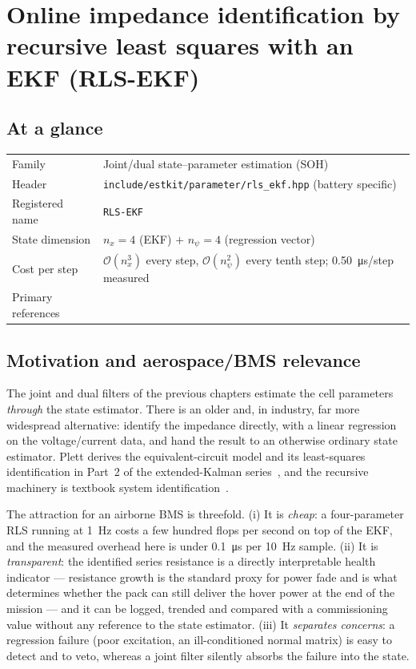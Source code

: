 \chapter{Online impedance identification by recursive least squares with an EKF (RLS-EKF)}
\label{ch:rlsekf}

\section*{At a glance}
\begin{tabular}{@{}l>{\raggedright\arraybackslash}p{}@{}}
Family & Joint/dual state--parameter estimation (SOH) \\
Header & \texttt{include/estkit/parameter/rls\_ekf.hpp} (battery specific) \\
Registered name & \texttt{RLS-EKF} \\
State dimension & $n_x=4$ (EKF) $+$ $n_\psi=4$ (regression vector) \\
Cost per step & $\mathcal{O}(n_x^3)$ every step, $\mathcal{O}(n_\psi^2)$ every tenth step; \SI{0.50}{\micro\second}/step measured \\
Primary references & \cite{plett2004ekf2,plett2004ekf3,ljung1999,plett2016bms2} \\
\end{tabular}

\section{Motivation and aerospace/BMS relevance}
The joint and dual filters of the previous chapters estimate the cell parameters \emph{through} the
state estimator.  There is an older and, in industry, far more widespread alternative: identify the
impedance directly, with a linear regression on the voltage/current data, and hand the result to an
otherwise ordinary state estimator.  Plett derives the equivalent-circuit model and its
least-squares identification in Part~2 of the extended-Kalman series~\cite{plett2004ekf2}, and the
recursive machinery is textbook system identification~\cite[Ch.~11]{ljung1999}.

The attraction for an airborne BMS is threefold.  (i) It is \emph{cheap}: a four-parameter RLS
running at \SI{1}{\hertz} costs a few hundred flops per second on top of the EKF, and the measured
overhead here is under \SI{0.1}{\micro\second} per \SI{10}{\hertz} sample.  (ii) It is
\emph{transparent}: the identified series resistance is a directly interpretable health indicator
--- resistance growth is the standard proxy for power fade and is what determines whether the pack
can still deliver the hover power at the end of the mission --- and it can be logged, trended and
compared with a commissioning value without any reference to the state estimator.  (iii) It
\emph{separates concerns}: a regression failure (poor excitation, an ill-conditioned normal matrix)
is easy to detect and to veto, whereas a joint filter silently absorbs the failure into the state.

